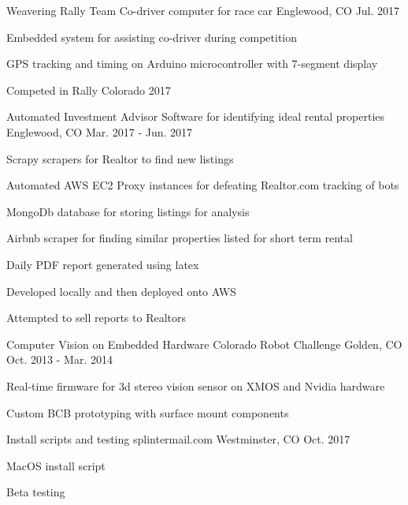 \begin{cventries}
  \cventry
    {Weavering Rally Team}
    {Co-driver computer for race car}
    {Englewood, CO} %
    {Jul. 2017} %
    {
      \begin{cvitems} %
        \item {Embedded system for assisting co-driver during competition}
        \item {GPS tracking and timing on Arduino microcontroller with 7-segment display}
        \item {Competed in Rally Colorado 2017}
      \end{cvitems}
    }

  \cventry
    {Automated Investment Advisor}
    {Software for identifying ideal rental properties}
    {Englewood, CO} %
    {Mar. 2017 - Jun. 2017} %
    {
      \begin{cvitems} %
        \item {Scrapy scrapers for Realtor to find new listings}
        \item {Automated AWS EC2 Proxy instances for defeating Realtor.com tracking of bots}
        \item {MongoDb database for storing listings for analysis}
        \item {Airbnb scraper for finding similar properties listed for short term rental}
        \item {Daily PDF report generated using latex}
        \item {Developed locally and then deployed onto AWS}
        \item {Attempted to sell reports to Realtors}
      \end{cvitems}
    }


  \cventry
    {Computer Vision on Embedded Hardware}
    {Colorado Robot Challenge}
    {Golden, CO} %
    {Oct. 2013 - Mar. 2014} %
    {
      \begin{cvitems} %
        \item {Real-time firmware for 3d stereo vision sensor on XMOS and Nvidia hardware}
        \item {Custom BCB prototyping with surface mount components}
      \end{cvitems}
    }

  \cventry
    {Install scripts and testing}
    {splintermail.com}
    {Westminster, CO} %
    {Oct. 2017} %
    {
      \begin{cvitems} %
        \item {MacOS install script}
        \item {Beta testing}
      \end{cvitems}
    }

\end{cventries}
